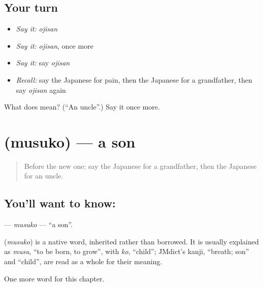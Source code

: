 \subsection*{Your turn}
\begin{itemize}
\raggedright
  \item \emph{Say it:} \emph{ojisan}
  \item \emph{Say it:} \emph{ojisan}, once more
  \item \emph{Say it:} say \emph{ojisan}
  \item \emph{Recall:} say the Japanese for pain, then the Japanese for a grandfather, then say \emph{ojisan} again
\end{itemize}

\begin{tcolorbox}[breakable,colback=teal!4,colframe=teal!35!black,title={Before you move on}]
What does  mean? (\textquotedblleft{}An uncle\textquotedblright{}.) Say it once more.
\end{tcolorbox}
\section[\texorpdfstring{\ja{むすこ} (musuko)}{むすこ (musuko)}]{ (musuko) — a son}

\label{lesson:JA-C24-musuko}



\begin{quote}
Before the new one: say the Japanese for a grandfather, then the Japanese for an uncle.
\end{quote}

\subsection*{You'll want to know: }
\textbf{} — \emph{musuko} — \textquotedblleft{}a son\textquotedblright{}.

\begin{cousinweb}
\textbf{} (\emph{musuko}) is a native word, inherited rather than borrowed. It is usually explained as \emph{musu}, \textquotedblleft{}to be born, to grow\textquotedblright{}, with \emph{ko}, \textquotedblleft{}child\textquotedblright{}; JMdict's kanji, \textquotedblleft{}breath; son\textquotedblright{} and \textquotedblleft{}child\textquotedblright{}, are read as a whole for their meaning.
\end{cousinweb}

\begin{grammarlens}[title={What you've built}]
One more word for this chapter.
\end{grammarlens}

